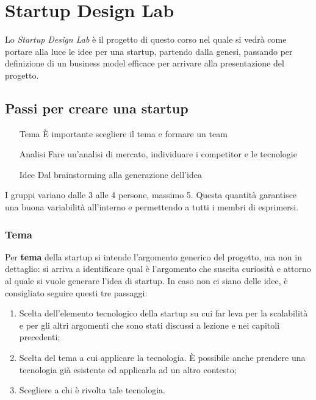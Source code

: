 \chapter{Startup Design Lab}

Lo \emph{Startup Design Lab} è il progetto di questo corso nel quale si vedrà
come portare alla luce le idee per una startup, partendo dalla genesi, passando
per definizione di un business model efficace per arrivare alla presentazione
del progetto.

\section{Passi per creare una startup}

\begin{itemize}
 \item[Tema] È importante scegliere il tema e formare un team
 \item[Analisi] Fare un'analisi di mercato, individuare i competitor e le
tecnologie
 \item[Idee] Dal brainstorming alla generazione dell'idea
\end{itemize}


I gruppi variano dalle 3 alle 4 persone, massimo 5. Questa quantità garantisce
una buona variabilità all'interno e permettendo a tutti i membri di esprimersi.

\subsection{Tema}
Per \textbf{tema} della startup si intende l'argomento generico del progetto,
ma non in dettaglio: si arriva a identificare qual è l'argomento che suscita
curiosità e attorno al quale si vuole generare l'idea di startup. In caso non
ci siano delle idee, è consigliato seguire questi tre passaggi:
\begin{enumerate}
 \item Scelta dell'elemento tecnologico della startup su cui far leva per la
 scalabilità e per gli altri argomenti che sono stati discussi a lezione e nei
 capitoli precedenti;
 \item Scelta del tema a cui applicare la tecnologia. È possibile anche
 prendere una tecnologia già esistente ed applicarla ad un altro contesto;
 \item Scegliere a chi è rivolta tale tecnologia.
\end{enumerate}

